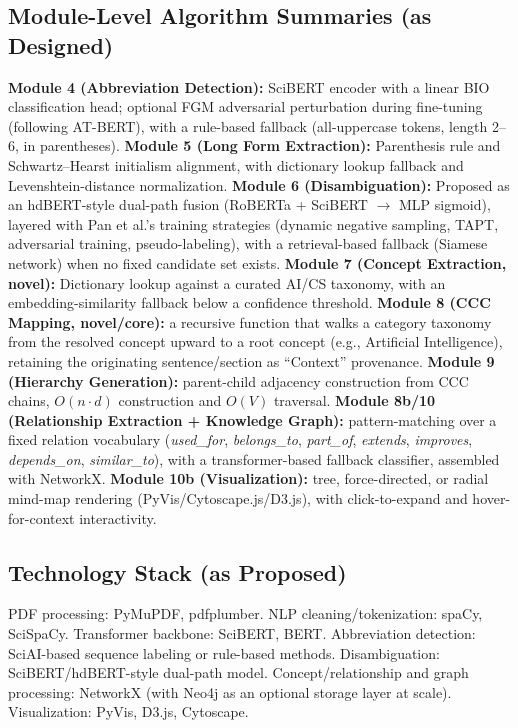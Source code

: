 \documentclass[10pt,conference]{IEEEtran}
\begin{document}
\subsection{Module-Level Algorithm Summaries (as Designed)}
\textbf{Module 4 (Abbreviation Detection):} SciBERT encoder with a linear BIO classification head; optional FGM adversarial perturbation during fine-tuning (following AT-BERT), with a rule-based fallback (all-uppercase tokens, length 2--6, in parentheses). \textbf{Module 5 (Long Form Extraction):} Parenthesis rule and Schwartz--Hearst initialism alignment, with dictionary lookup fallback and Levenshtein-distance normalization. \textbf{Module 6 (Disambiguation):} Proposed as an hdBERT-style dual-path fusion (RoBERTa + SciBERT $\rightarrow$ MLP sigmoid), layered with Pan et al.'s training strategies (dynamic negative sampling, TAPT, adversarial training, pseudo-labeling), with a retrieval-based fallback (Siamese network) when no fixed candidate set exists. \textbf{Module 7 (Concept Extraction, novel):} Dictionary lookup against a curated AI/CS taxonomy, with an embedding-similarity fallback below a confidence threshold. \textbf{Module 8 (CCC Mapping, novel/core):} a recursive function that walks a category taxonomy from the resolved concept upward to a root concept (e.g., Artificial Intelligence), retaining the originating sentence/section as ``Context'' provenance. \textbf{Module 9 (Hierarchy Generation):} parent-child adjacency construction from CCC chains, $O(n{\cdot}d)$ construction and $O(V)$ traversal. \textbf{Module 8b/10 (Relationship Extraction + Knowledge Graph):} pattern-matching over a fixed relation vocabulary (\textit{used\_for}, \textit{belongs\_to}, \textit{part\_of}, \textit{extends}, \textit{improves}, \textit{depends\_on}, \textit{similar\_to}), with a transformer-based fallback classifier, assembled with NetworkX. \textbf{Module 10b (Visualization):} tree, force-directed, or radial mind-map rendering (PyVis/Cytoscape.js/D3.js), with click-to-expand and hover-for-context interactivity.

\subsection{Technology Stack (as Proposed)}
PDF processing: PyMuPDF, pdfplumber. NLP cleaning/tokenization: spaCy, SciSpaCy. Transformer backbone: SciBERT, BERT. Abbreviation detection: SciAI-based sequence labeling or rule-based methods. Disambiguation: SciBERT/hdBERT-style dual-path model. Concept/relationship and graph processing: NetworkX (with Neo4j as an optional storage layer at scale). Visualization: PyVis, D3.js, Cytoscape.
\end{document}
